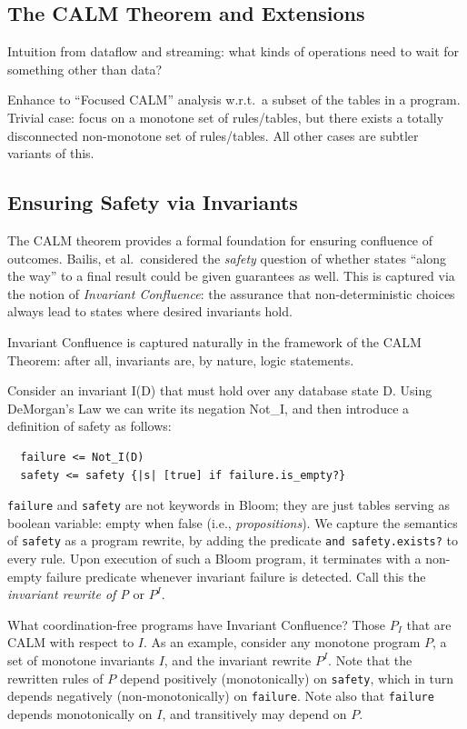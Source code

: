 \documentclass{sig-alternate}
\begin{document}
\subsection{The CALM Theorem and Extensions}
Intuition from dataflow and streaming: what kinds of operations need to wait for something other than data?  

Enhance to ``Focused CALM'' analysis w.r.t.\ a subset of the tables in a program.  Trivial case: focus on a monotone set of rules/tables, but there exists a totally disconnected non-monotone set of rules/tables.  All other cases are subtler variants of this.

\subsection{Ensuring Safety via Invariants}
The CALM theorem provides a formal foundation for ensuring confluence of outcomes.  Bailis, et al.~considered the \emph{safety} question of whether states ``along the way'' to a final result could be given guarantees as well.  This is captured via the notion of \emph{Invariant Confluence}: the assurance that non-deterministic choices always lead to states where desired invariants hold.

Invariant Confluence is captured naturally in the framework of the CALM Theorem: after all, invariants are, by nature, logic statements.

Consider an invariant I(D) that must hold over any database state D.  Using DeMorgan's Law we can write its negation Not\_I, and then introduce a definition of safety as follows:

\begin{verbatim}
  failure <= Not_I(D)
  safety <= safety {|s| [true] if failure.is_empty?}
\end{verbatim}

\texttt{failure} and \texttt{safety} are not keywords in Bloom; they are just tables serving as boolean variable: empty when false (i.e., \emph{propositions}). We capture the semantics of \texttt{safety} as a program rewrite, by adding the predicate \texttt{and safety.exists?} to every rule.  Upon execution of such a Bloom program, it terminates with a non-empty failure predicate whenever invariant failure is detected.  Call this the \emph{invariant rewrite of P} or $P^I$.  

What coordination-free programs have Invariant Confluence?   Those $P_I$ that are CALM with respect to $I$. As an example, consider any monotone program $P$, a set of monotone invariants $I$, and the invariant rewrite $P^I$.  Note that the rewritten rules of $P$ depend positively (monotonically) on \texttt{safety}, which in turn depends negatively (non-monotonically) on \texttt{failure}.  Note also that \texttt{failure} depends monotonically on $I$, and transitively may depend on $P$.
\end{document}
